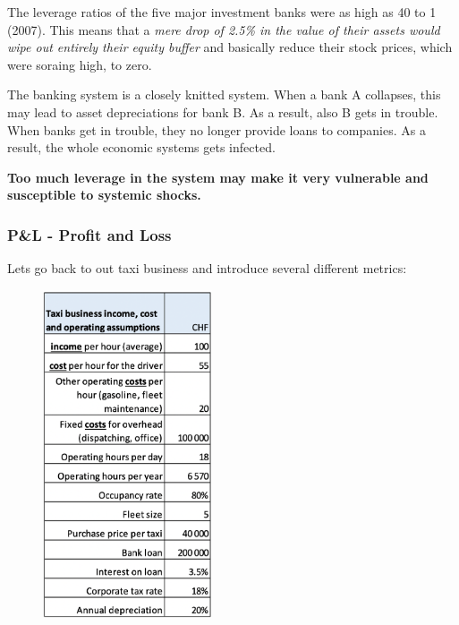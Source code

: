 \documentclass[a4paper]{extarticle}
\begin{document}
The leverage ratios of the five major investment banks were as high as 40 to 1 (2007). This means that a \textit{mere drop of 2.5\% in the value of their assets would wipe out entirely their equity buffer} and basically reduce their stock prices, which were soraing high, to zero.

The banking system is a closely knitted system. When a bank A collapses, this may lead to asset depreciations for bank B. As a result, also B gets in trouble. When banks get in trouble, they no longer provide loans to companies. As a result, the whole economic systems gets infected.

\textbf{Too much leverage in the system may make it very vulnerable and susceptible to systemic shocks.}

\subsubsection{P\&L - Profit and Loss}

Lets go back to out taxi business and introduce several different metrics:

\begin{figure}[H]
    \includegraphics[width=5cm]{../images/EnpRisk_Fig3-5}
    \centering
\end{figure}
\end{document}
